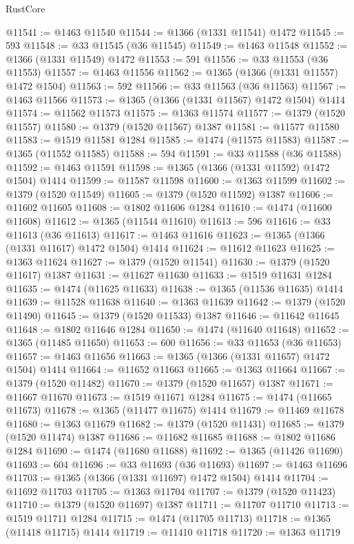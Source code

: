 \begin{lexlean}{RustCore}
\begin{coremodule}
@11541 := @1463 @11540
@11544 := @1366 (@1331 @11541) @1472
@11545 := 593
@11548 := @33 @11545 (@36 @11545)
@11549 := @1463 @11548
@11552 := @1366 (@1331 @11549) @1472
@11553 := 591
@11556 := @33 @11553 (@36 @11553)
@11557 := @1463 @11556
@11562 := @1365 (@1366 (@1331 @11557) @1472 @1504)
@11563 := 592
@11566 := @33 @11563 (@36 @11563)
@11567 := @1463 @11566
@11573 := @1365 (@1366 (@1331 @11567) @1472 @1504) @1414
@11574 := @11562 @11573
@11575 := @1363 @11574
@11577 := @1379 (@1520 @11557)
@11580 := @1379 (@1520 @11567) @1387
@11581 := @11577 @11580
@11583 := @1519 @11581 @1284
@11585 := @1474 (@11575 @11583)
@11587 := @1365 (@11552 @11585)
@11588 := 594
@11591 := @33 @11588 (@36 @11588)
@11592 := @1463 @11591
@11598 := @1365 (@1366 (@1331 @11592) @1472 @1504) @1414
@11599 := @11587 @11598
@11600 := @1363 @11599
@11602 := @1379 (@1520 @11549)
@11605 := @1379 (@1520 @11592) @1387
@11606 := @11602 @11605
@11608 := @1802 @11606 @1284
@11610 := @1474 (@11600 @11608)
@11612 := @1365 (@11544 @11610)
@11613 := 596
@11616 := @33 @11613 (@36 @11613)
@11617 := @1463 @11616
@11623 := @1365 (@1366 (@1331 @11617) @1472 @1504) @1414
@11624 := @11612 @11623
@11625 := @1363 @11624
@11627 := @1379 (@1520 @11541)
@11630 := @1379 (@1520 @11617) @1387
@11631 := @11627 @11630
@11633 := @1519 @11631 @1284
@11635 := @1474 (@11625 @11633)
@11638 := @1365 (@11536 @11635) @1414
@11639 := @11528 @11638
@11640 := @1363 @11639
@11642 := @1379 (@1520 @11490)
@11645 := @1379 (@1520 @11533) @1387
@11646 := @11642 @11645
@11648 := @1802 @11646 @1284
@11650 := @1474 (@11640 @11648)
@11652 := @1365 (@11485 @11650)
@11653 := 600
@11656 := @33 @11653 (@36 @11653)
@11657 := @1463 @11656
@11663 := @1365 (@1366 (@1331 @11657) @1472 @1504) @1414
@11664 := @11652 @11663
@11665 := @1363 @11664
@11667 := @1379 (@1520 @11482)
@11670 := @1379 (@1520 @11657) @1387
@11671 := @11667 @11670
@11673 := @1519 @11671 @1284
@11675 := @1474 (@11665 @11673)
@11678 := @1365 (@11477 @11675) @1414
@11679 := @11469 @11678
@11680 := @1363 @11679
@11682 := @1379 (@1520 @11431)
@11685 := @1379 (@1520 @11474) @1387
@11686 := @11682 @11685
@11688 := @1802 @11686 @1284
@11690 := @1474 (@11680 @11688)
@11692 := @1365 (@11426 @11690)
@11693 := 604
@11696 := @33 @11693 (@36 @11693)
@11697 := @1463 @11696
@11703 := @1365 (@1366 (@1331 @11697) @1472 @1504) @1414
@11704 := @11692 @11703
@11705 := @1363 @11704
@11707 := @1379 (@1520 @11423)
@11710 := @1379 (@1520 @11697) @1387
@11711 := @11707 @11710
@11713 := @1519 @11711 @1284
@11715 := @1474 (@11705 @11713)
@11718 := @1365 (@11418 @11715) @1414
@11719 := @11410 @11718
@11720 := @1363 @11719

\end{coremodule}
\end{lexlean}
